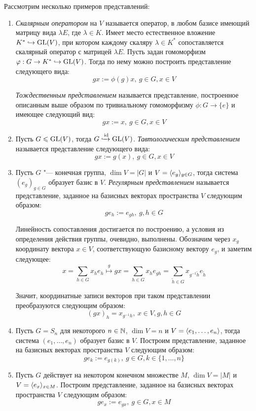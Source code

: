\begin{example}
	Рассмотрим несколько примеров представлений:
	\begin{enumerate}
		\item \textit{Скалярным оператором} на $V$ называется оператор, в любом базисе имеющий матрицу вида $\lambda E$, где $\lambda \in K$. Имеет место естественное вложение $K^* \hookrightarrow \operatorname{GL}(V)$, при котором каждому скаляру $\lambda \in K^*$ сопоставляется скалярный оператор с матрицей $\lambda E$. Пусть задан гомоморфизм $\varphi: G \to K^* \hookrightarrow \operatorname{GL}(V)$. Тогда по нему можно построить представление следующего вида:
		\[gx := \phi(g)x,~g \in G, x \in V\]
		
		\textit{Тождественным представлением} называется представление, построенное описанным выше образом по тривиальному гомоморфизму $\phi : G \to \{e\}$ и имеющее следующий вид:
		\[gx := x,~g \in G, x \in V\]
		
		\item Пусть $G \leqslant \operatorname{GL}(V)$, тогда $G \xhookrightarrow[]{\mathrm{id}} \operatorname{GL}(V)$. \textit{Тавтологическим представлением} называется представление следующего вида:
		\[gx := g(x),~g \in G, x \in V\]
		
		\item Пусть $G$ "--- конечная группа, $\dim{V} = |G|$ и $V = \langle e_g\rangle_{g \in G}$, тогда система $(e_g)_{g \in G}$ образует базис в $V$. \textit{Регулярным представлением} называется представление, заданное на базисных векторах пространства $V$ следующим образом:
		\[ge_h := e_{gh},~g, h \in G\]
		
		Линейность сопоставления достигается по построению, а условия из определения действия группы, очевидно, выполнены. Обозначим через $x_g$ координату вектора $x \in V$, соответствующую базисному вектору $e_g$, и заметим следующее:
		\[x = \sum_{h \in G}x_he_h \stackrel{g}{\mapsto} gx = \sum_{h \in G}x_he_{gh} = \sum_{\widetilde h \in G}x_{g^{-1}\widetilde h}e_{\widetilde h}\]
		
		Значит, координатные записи векторов при таком представлении преобразуются следующим образом:
		\[(gx)_h = x_{g^{-1}h},~x \in V, g, h \in G\]
		
		\item Пусть $G = S_n$ для некоторого $n \in \mathbb{N}$, $\dim{V} = n$ и $V = \langle e_1, \dotsc, e_n\rangle$, тогда система $(e_1, \dotsc, e_n)$ образует базис в $V$. Построим представление, заданное на базисных векторах пространства $V$ следующим образом:
		\[ge_k := e_{g(k)},~g \in G, k \in \{1, \dotsc, n\}\]
		
		\item Пусть $G$ действует на некотором конечном множестве $M$, $\dim{V} = |M|$ и $V = \langle e_x \rangle_{x \in M}$. Построим представление, заданное на базисных векторах пространства $V$ следующим образом:
		\[ge_x := e_{gx},~g \in G, x \in M\]
	\end{enumerate}
\end{example}

